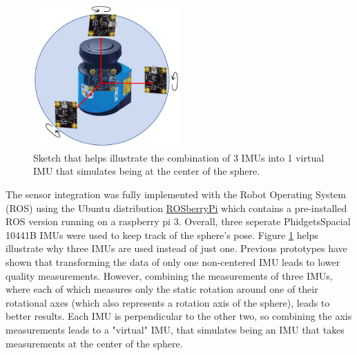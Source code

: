 \begin{figure}                                                                                                                                                                                                    
\centering
\includegraphics[width=0.5\textwidth]{../Media/virtualIMU.png}                                                                                                                                                      
\caption{Sketch that helps illustrate the combination of 3 IMUs into 1 virtual IMU that simulates being at the center of the sphere.}                                                                                                                           
\label{sec:SensorIntegration:fig:virtual}                                                                                                                                                                       
\end{figure}                                                                                                                                                                                                      

The sensor integration was fully implemented with the Robot Operating System (ROS) using the Ubuntu distribution \href{http://wiki.ros.org/ROSberryPi}{ROSberryPi} which contains a pre-installed ROS version running on a raspberry pi 3.
Overall, three seperate PhidgetsSpacial 10441B IMUs \cite{imuphidgets} were used to keep track of the sphere's pose. Figure \ref{sec:SensorIntegration:fig:virtual} helps illustrate why three IMUs are used instead of just one. Previous prototypes have shown that transforming the data of only one non-centered IMU leads to lower quality measurements. However, combining the measurements of three IMUs, where each of which measures only the static rotation around one of their rotational axes (which also represents a rotation axis of the sphere), leads to better results. Each IMU is perpendicular to the other two, so combining the axis measurements leads to a "virtual" IMU, that simulates being an IMU that takes measurements at the center of the sphere. 

